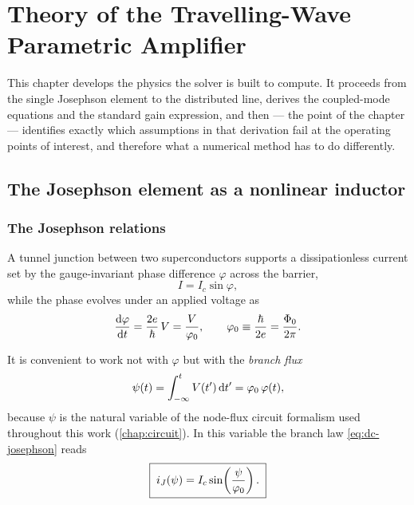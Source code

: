 \chapter{Theory of the Travelling-Wave Parametric Amplifier}
\label{chap:theory}

This chapter develops the physics the solver is built to compute. It proceeds
from the single Josephson element to the distributed line, derives the
coupled-mode equations and the standard gain expression, and then --- the point
of the chapter --- identifies exactly which assumptions in that derivation fail
at the operating points of interest, and therefore what a numerical method has
to do differently.

\section{The Josephson element as a nonlinear inductor}

\subsection{The Josephson relations}

A tunnel junction between two superconductors supports a dissipationless
current set by the gauge-invariant phase difference $\varphi$ across the
barrier,
\begin{equation}
  I = I_c \sin\varphi,
  \label{eq:dc-josephson}
\end{equation}
while the phase evolves under an applied voltage as
\begin{equation}
  \frac{\mathrm{d}\varphi}{\mathrm{d}t} = \frac{2e}{\hbar}\,V
  = \frac{V}{\varphi_{0}},
  \qquad
  \varphi_{0} \equiv \frac{\hbar}{2e} = \frac{\Phi_{0}}{2\pi}.
  \label{eq:ac-josephson}
\end{equation}

It is convenient to work not with $\varphi$ but with the \emph{branch flux}
\begin{equation}
  \psi(t) = \int_{-\infty}^{t} V(t')\,\mathrm{d}t' = \varphi_{0}\,\varphi(t),
\end{equation}
because $\psi$ is the natural variable of the node-flux circuit formalism used
throughout this work (\cref{chap:circuit}). In this variable the branch law
\eqref{eq:dc-josephson} reads
\begin{equation}
  \boxed{\;
  i_J(\psi) = I_c \sin\!\left(\frac{\psi}{\varphi_{0}}\right).
  \;}
  \label{eq:branch-law}
\end{equation}


